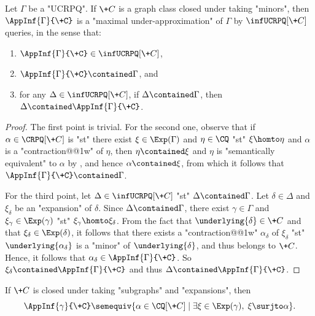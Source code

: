 \begin{proposition}
	\AP\label{prop:max-under-approx}
	Let $\Gamma$ be a "UCRPQ".
	If $\+C$ is a graph class closed under taking "minors", then
	$\AppInf{\Gamma}{\+C}$ is a "maximal under-approximation" of $\Gamma$ by $\infUCRPQ[\+C]$ queries, in the sense that:
	\begin{enumerate}
		\item $\AppInf{\Gamma}{\+C} \in \infUCRPQ[\+C]$,
		\item $\AppInf{\Gamma}{\+C} \contained \Gamma$, and
		\item for any $\Delta \in \infUCRPQ[\+C]$, if $\Delta \contained \Gamma$, then $\Delta \contained \AppInf{\Gamma}{\+C}$.
	\end{enumerate}
\end{proposition}

\begin{proof}
	The first point is trivial. For the second one, observe that
	if $\alpha \in \CRPQ[\+C]$ is "st" there exist $\xi \in \Exp(\Gamma)$ and
	$\eta \in \CQ$ "st" $\xi \homto \eta$ and $\alpha$ is a "contraction@@1w" of $\eta$,
	then $\eta \contained \xi$ and $\eta$ is "semantically equivalent" to $\alpha$ by , and hence $\alpha \contained \xi$, from which it follows that $\AppInf{\Gamma}{\+C} \contained \Gamma$.

	For the third point, let $\Delta \in \infUCRPQ[\+C]$ "st" $\Delta \contained \Gamma$. Let $\delta \in \Delta$ and $\xi_{\delta}$ be an "expansion" of $\delta$. Since $\Delta \contained \Gamma$, there exist $\gamma \in \Gamma$ and $\xi_{\gamma} \in \Exp(\gamma)$ "st" $\xi_{\gamma} \homto \xi_{\delta}$. From the fact that $\underlying{\delta} \in \+C$ and that $\xi_{\delta} \in \Exp(\delta)$, it follows that there exists a "contraction@@1w" $\alpha_{\delta}$ of $\xi_{\delta}$ "st" $\underlying{\alpha_{\delta}}$ is a "minor" of $\underlying{\delta}$, and thus belongs to $\+C$.
	Hence, it follows that $\alpha_{\delta} \in \AppInf{\Gamma}{\+C}$.
	So $\xi_{\delta} \contained \AppInf{\Gamma}{\+C}$ and thus
	$\Delta \contained \AppInf{\Gamma}{\+C}$.
\end{proof}

\begin{remark}
	If $\+C$ is closed under taking "subgraphs" and "expansions", then
	\[\AppInf{\gamma}{\+C} \semequiv \{
		\alpha \in \CQ[\+C] \mid \exists \xi \in \Exp(\gamma),\;
		\xi \surjto \alpha
	\}.\qedhere\]
\end{remark}

